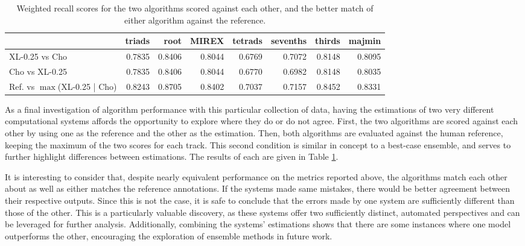 \begin{table}[t]
\begin{center}
\scriptsize
\caption{Weighted recall scores for the two algorithms scored against each other, and the better match of either algorithm against the reference.}
\label{tab:algo_vs_algo}

\begin{tabular}{lrrrrrrr}
\hline
         &   triads &   root &   MIREX &   tetrads &   sevenths &   thirds &   majmin \\
\hline
 XL-0.25 vs Cho &   0.7835 & 0.8406 &  0.8044 &    0.6769 &     0.7072 &   0.8148 &   0.8095 \\
 Cho vs XL-0.25 &   0.7835 & 0.8406 &  0.8044 &    0.6770 &     0.6982 &   0.8148 &   0.8035 \\
 \hline
 Ref. vs $\max$(XL-0.25 | Cho) &   0.8243 & 0.8705  &  0.8402  &   0.7037   &   0.7157  &  0.8452  &  0.8331 \\
\hline
\end{tabular}
\end{center}
\end{table}

As a final investigation of algorithm performance with this particular collection of data, having the estimations of two very different computational systems affords the opportunity to explore where they do or do not agree.
First, the two algorithms are scored against each other by using one as the reference and the other as the estimation.
Then, both algorithms are evaluated against the human reference, keeping the maximum of the two scores for each track.
This second condition is similar in concept to a best-case ensemble, and serves to further highlight differences between estimations.
The results of each are given in Table \ref{tab:algo_vs_algo}.

It is interesting to consider that, despite nearly equivalent performance on the metrics reported above, the algorithms match each other about as well as either matches the reference annotations.
If the systems made same mistakes, there would be better agreement between their respective outputs.
Since this is not the case, it is safe to conclude that the errors made by one system are sufficiently different than those of the other.
This is a particularly valuable discovery, as these systems offer two sufficiently distinct, automated perspectives and can be leveraged for further analysis.
Additionally, combining the systems' estimations shows that there are some instances where one model outperforms the other, encouraging the exploration of ensemble methods in future work.

